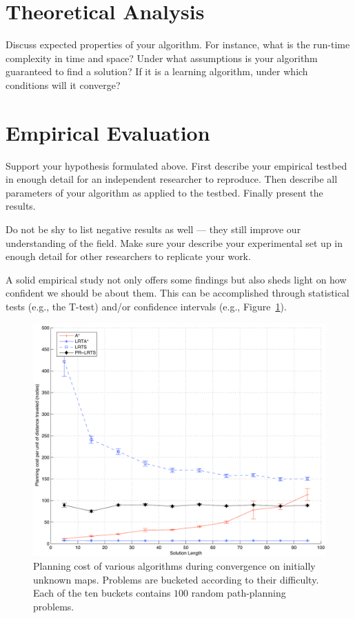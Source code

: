 \documentclass[letterpaper]{article}
\numberwithin{equation}{section}
\numberwithin{theorem}{section}
\numberwithin{lemma}{section}
\numberwithin{df}{section}
\begin{document}
\section{Theoretical Analysis}

Discuss expected properties of your algorithm. For instance, what is the run-time complexity in time and space? Under what assumptions is your algorithm guaranteed to find a solution? If it is a learning algorithm, under which conditions will it converge?

\section{Empirical Evaluation}

Support your hypothesis formulated above. First describe your empirical testbed in enough detail for an independent researcher to reproduce. Then describe all parameters of your algorithm as applied to the testbed. Finally present the results.

Do not be shy to list negative results as well --- they still improve our understanding of the field. Make sure your describe your experimental set up in enough detail for other researchers to replicate your work.

A solid empirical study not only offers some findings but also sheds light on how confident we should be about them. This can be accomplished through statistical tests (e.g., the T-test) and/or confidence intervals (e.g., Figure~\ref{fig:convPC}).

\begin{figure}[t]
\begin{center}
\includegraphics[width=\textwidth]{convPC.pdf}
\caption{\small Planning cost of various algorithms during convergence on initially unknown maps. Problems are bucketed according to their difficulty. Each of the ten buckets contains $100$ random path-planning problems.}\label{fig:convPC}
\end{center}
\end{figure}
\end{document}
